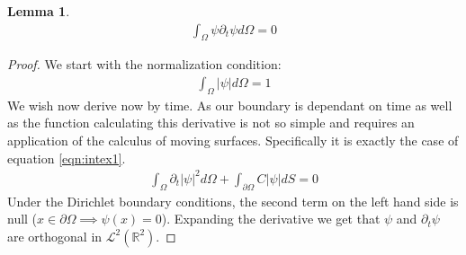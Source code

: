 \documentclass{article}
\theoremstyle{plain}
\newtheorem{lem}{Lemma}
\theoremstyle{definition}
\theoremstyle{remark}
\newcommand{\R}{\ensuremath{\mathbb{R}}}
\begin{document}
\begin{lem}
	\begin{gather}
	\int_{\Omega}\psi\partial_{t}\psi d\Omega =0
	\end{gather}
\end{lem}
\begin{proof}
	We start with the normalization condition:
	\begin{gather}
	\int_{\Omega}\left|\psi\right|d\Omega=1
	\end{gather}
	We wish now derive now by time. As our boundary is dependant on time as well as the function calculating this derivative is not so simple and requires an application of the calculus of moving surfaces. Specifically it is exactly the case of equation \ref{eqn:intex1}. 
	\begin{gather}
	\int_{\Omega}\partial_{t}\left|\psi\right|^{2}d\Omega+\int_{\partial \Omega}C\left|\psi\right|dS=0
	\end{gather}
	Under the Dirichlet boundary conditions, the second term on the left hand side is null ($ x\in\partial\Omega\implies\psi(x)=0 $). Expanding the derivative we get that $ \psi $ and $ \partial_{t}\psi $ are orthogonal in $ \mathcal{L}^{2}(\R^{2}) $.
\end{proof}
\end{document}
